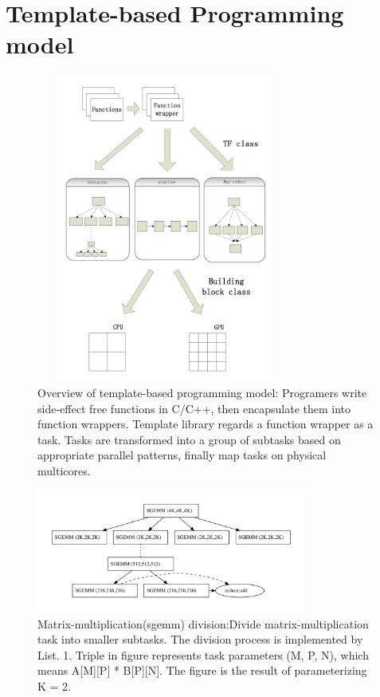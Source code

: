 \section{Template-based Programming model}\label{sec:model}

\begin{figure}[tp]
\includegraphics[width=3.3in, height=4.0in]{../overview}
\caption{Overview of template-based programming model: Programers
write side-effect free functions in C/C++, then encapsulate them into
function wrappers. Template library regards a function wrapper as
a task. Tasks are transformed into a
group of subtasks based on appropriate parallel patterns, finally map tasks on physical multicores.}\label{fig:overview}
\end{figure}

\hspace{-1ex}\begin{figure}[tp]
\includegraphics[width=3.5in]{../mmexample}
\caption{Matrix-multiplication(sgemm) division:Divide 
matrix-multiplication task into smaller subtasks. The division process
is implemented by List. 1. Triple in figure represents
task parameters (M, P, N), which means A[M][P] * B[P][N]. The figure
is the result of parameterizing K = 2. } \label{fig:mmexample}
\end{figure}


